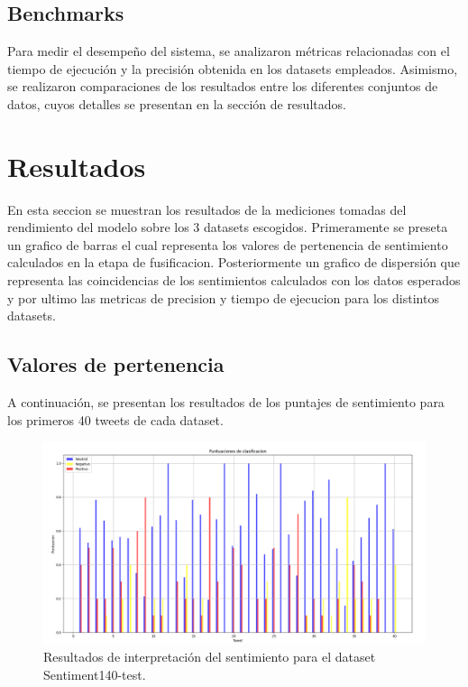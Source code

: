 \documentclass[sigconf, review=false, nonacm]{acmart}
\begin{document}
\subsection{Benchmarks}
Para medir el desempeño del sistema, se analizaron métricas relacionadas
con el tiempo de ejecución y la precisión obtenida en los datasets empleados.
Asimismo, se realizaron comparaciones de los resultados entre los diferentes conjuntos de datos,
cuyos detalles se presentan en la sección de resultados.

\section{Resultados}
En esta seccion se muestran los resultados de la mediciones tomadas del rendimiento del modelo sobre los 3
datasets escogidos. Primeramente se preseta un grafico de barras el cual representa los valores de
pertenencia de sentimiento calculados en la etapa de fusificacion. Posteriormente un grafico de dispersión que
representa las coincidencias de los sentimientos calculados con los datos esperados y por ultimo las metricas
de precision y tiempo de ejecucion para los distintos datasets.

\subsection{Valores de pertenencia}
A continuación, se presentan los resultados de los puntajes de sentimiento para los primeros
40 tweets de cada dataset.

\begin{figure}[H]
	\centering
	\includegraphics[width=\linewidth]{../results/barras/sentiment140.png}
	\caption{Resultados de interpretación del sentimiento para el dataset Sentiment140-test.}
	\label{fig:sentiment140}
\end{figure}
\end{document}
